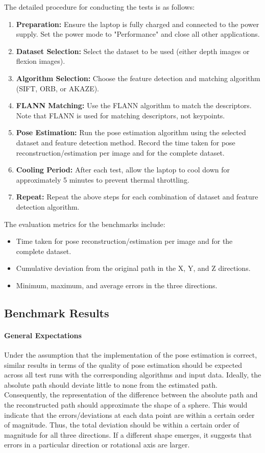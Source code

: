 \documentclass[conference, a4paper]{IEEEtran}
\begin{document}
The detailed procedure for conducting the tests is as follows:
\begin{enumerate}
	\item \textbf{Preparation:} Ensure the laptop is fully charged and connected to the power supply. Set the power mode to "Performance" and close all other applications.
	\item \textbf{Dataset Selection:} Select the dataset to be used (either depth images or flexion images).
	\item \textbf{Algorithm Selection:} Choose the feature detection and matching algorithm (SIFT, ORB, or AKAZE).
	\item \textbf{FLANN Matching:} Use the FLANN algorithm to match the descriptors. Note that FLANN is used for matching descriptors, not keypoints.
	\item \textbf{Pose Estimation:} Run the pose estimation algorithm using the selected dataset and feature detection method. Record the time taken for pose reconstruction/estimation per image and for the complete dataset.
	\item \textbf{Cooling Period:} After each test, allow the laptop to cool down for approximately 5 minutes to prevent thermal throttling.
	\item \textbf{Repeat:} Repeat the above steps for each combination of dataset and feature detection algorithm.
\end{enumerate}

The evaluation metrics for the benchmarks include:

\begin{itemize}
	\item Time taken for pose reconstruction/estimation per image and for the complete dataset.
	\item Cumulative deviation from the original path in the X, Y, and Z directions.
	\item Minimum, maximum, and average errors in the three directions.
\end{itemize}


\subsection{Benchmark Results}

\paragraph{General Expectations}

Under the assumption that the implementation of the pose estimation is correct, similar results in terms of the quality of pose estimation should be expected across all test runs with the corresponding algorithms and input data. Ideally, the absolute path should deviate little to none from the estimated path. Consequently, the representation of the difference between the absolute path and the reconstructed path should approximate the shape of a sphere. This would indicate that the errors/deviations at each data point are within a certain order of magnitude. Thus, the total deviation should be within a certain order of magnitude for all three directions. If a different shape emerges, it suggests that errors in a particular direction or rotational axis are larger.
\end{document}
